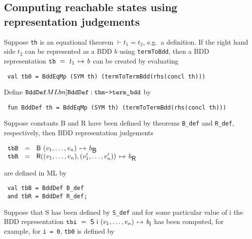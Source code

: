 \documentclass[12pt]{article}
\newcommand{\bnind}[1]{\index[MLbn]{#1}}
\newcommand{\con}[1]{\mbox{\sf #1}}
\newcommand{\ty}[1]{\mbox{\tt #1}}
\newcommand{\ml}[1]{{\tt #1}}
\newcommand{\globtermbdd}[2]{\mbox{$#1\hspace{0.5mm}\mapsto\hspace{0.5mm}#2$}}
\newcommand\termbddty{\texttt{term\_bdd}\xspace}
\newcommand\fun{\mbox{\tt{->}}}
\begin{document}
\subsection{Computing reachable states using representation judgements}\label{reach2}

Suppose \ml{th} is an equational theorem $\vdash t_1=t_2$, e.g.~a definition.
If the right hand side $t_2$ can be represented as a BDD $b$ using
\ml{termToBdd}, then a BDD representation $\ml{tb}~=~\globtermbdd{t_1}{b}$
can be created by evaluating

\vspace*{-1mm}

\begin{verbatim}
 val tb0 = BddEqMp (SYM th) (termToTermBdd(rhs(concl th)))
\end{verbatim}

\vspace*{-1mm}

\noindent Define $\ml{BddDef}\bnind{\ml{BddDef}}:\ty{thm}\fun\termbddty$ by

\vspace*{-1mm}

\begin{verbatim}
 fun BddDef th = BddEqMp (SYM th) (termToTermBdd(rhs(concl th)))
\end{verbatim}

\vspace*{-1mm}

Suppose constants \con{B} and \con{R} have been defined by theorems \ml{B\_def}
and \ml{R\_def}, respectively, then BDD representation judgements

\smallskip
$\begin{array}{l}
\ml{tbB}~~=~~\globtermbdd{\con{B}~(v_1,\ldots,v_n)}{b_{\con{B}}}\\
\ml{tbR}~~=~~\globtermbdd{\con{R}((v_1,\ldots,v_n),(v'_1,\ldots,v'_n))}{b_{\con{R}}}
\end{array}$
\smallskip

\noindent are defined in ML by

\vspace*{-1mm}

\begin{verbatim}
 val tbB = BddDef B_def
 and tbR = BddDef R_def;
\end{verbatim}

\vspace*{-1mm}

Suppose that \con{S} has been defined by \ml{S\_def} and for some
particular value of \con{i} the BDD representation
$\ml{tbi}~=~\globtermbdd{\con{S}~\con{i}~(v_1,\ldots,v_n)}{b_{\con{i}}}$
has been computed, for example, for \ml{\con{i} = 0}, \ml{tb0} is defined by
\end{document}
